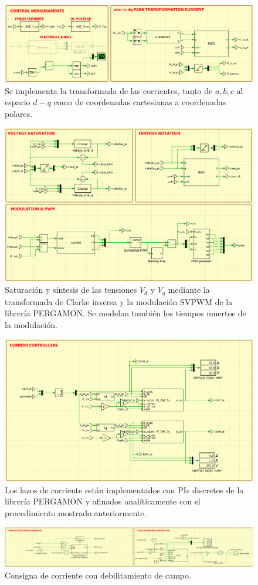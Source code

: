 \begin{figure}[H]
\centering
\includegraphics[width=0.7\linewidth]{fig/PLECS_acq2}
\caption{Se implementa la transformada de las corrientes, tanto de $a,b,c$ al espacio $d-q$ como de coordenadas cartesianas a coordenadas polares.}
\end{figure}
\begin{figure}[H]
	\centering
	\includegraphics[width=0.7\linewidth]{fig/PLECS_voltage}
	\caption{Saturación y síntesis de las tensiones $V_d$ y $V_q$ mediante la transformada de Clarke inversa y la modulación SVPWM de la librería PERGAMON. Se modelan también los tiempos muertos de la modulación.}
	\label{fig:plecsvoltage}
\end{figure}
\begin{figure}[H]
	\centering
	\includegraphics[width=0.7\linewidth]{fig/PLECS_current-loop}
	\caption{Los lazos de corriente están implementados con PIs discretos de la librería PERGAMON y afinados analíticamente con el procedimiento mostrado anteriormente.}
\end{figure}
\begin{figure}[H]
	\centering
	\includegraphics[width=0.9\linewidth]{fig/PLECS_currentref}
	\caption{Consigna de corriente con debilitamiento de campo.}
\end{figure}
